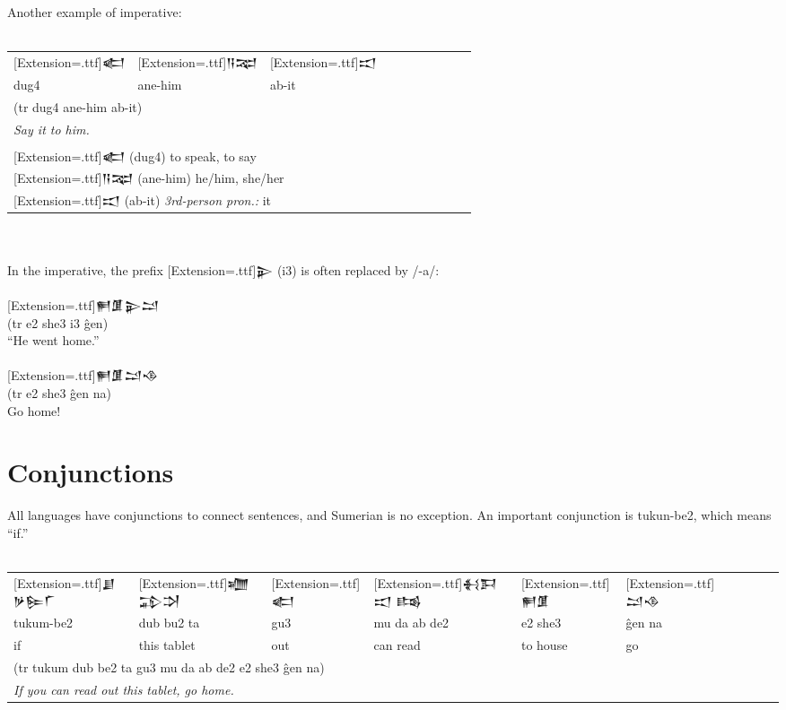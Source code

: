 \documentclass[a4paper,12pt]{book}
\newcommand{\fcn}{\setmainfont{Akkadian}[Extension=.ttf]}
\newcommand{\fcm}{\large\setmainfont{Akkadian}[Extension=.ttf]}
\newcommand{\fsm}{\Large\setmainfont{Akkadian}[Extension=.ttf]}
\begin{document}
\newpage
\noindent
Another example of imperative:\\

\verb||\\
\begin{tabular}[!h]{l l l l l l l l l l}
  \fsm 𒅗 &\fsm 𒀀𒉈 &\fsm 𒀊\\
  dug4 & ane-him & ab-it\\
  \multicolumn{3}{l}{(tr dug4 ane-him ab-it)}\\
  \multicolumn{3}{l}{\em Say it to him.}\\
  \hline\\
  \multicolumn{3}{l}{{\fcm 𒅗} (dug4) to speak, to say}\\
  \multicolumn{3}{l}{{\fcm 𒀀𒉈} (ane-him) he/him, she/her}\\
  \multicolumn{3}{l}{{\fcm 𒀊} (ab-it) {\em 3rd-person pron.:} it}\\
\end{tabular}

\verb||\\
\verb||\\
In the imperative, the prefix {\fcn 𒉌} (i3)
is often replaced by /-a/:\\

\verb||\\
{\fsm 𒂍𒂠𒉌𒁺}\\
(tr e2 she3 i3 ĝen)\\
``He went home.''\\

\verb||\\
{\fsm 𒂍𒂠𒁺𒈾}\\
(tr e2 she3 ĝen na)\\
Go home!

\newpage
\section*{Conjunctions}
All languages have conjunctions
to connect sentences, and Sumerian is no exception.
An important conjunction is tukun-be2,
which means ``if.''\\

\verb||\\
\begin{tabular}[!h]{l l l l l l l l l l}
 \large\fcn 𒋗𒃻𒌉𒇲 &\large\fcn 𒁾𒁉𒋫
 &\large\fcn 𒅗 &\large\fcn 𒈬𒁕𒀊 𒌤
 &\large\fcn 𒂍𒂠 &\large\fcn 𒁺𒈾\\
 tukum-be2 & dub bu2 ta & gu3 & mu da ab de2
 & e2 she3 & ĝen na\\
 if & this tablet & out & can read & to house & go\\
 \multicolumn{6}{l}{(tr tukum dub be2 ta gu3
   mu da ab de2 e2 she3 ĝen na)}\\
 \multicolumn{6}{l}{\em If you can read out this
 tablet, go home.}\\
\end{tabular}
\end{document}

